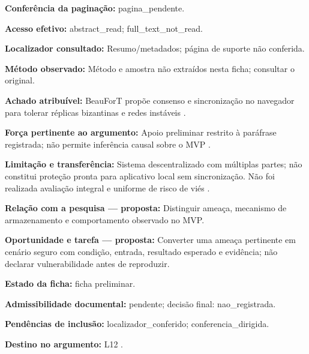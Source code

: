 \noindent\textbf{Conferência da paginação:} pagina\_pendente.\par\medskip

\noindent\textbf{Acesso efetivo:} abstract\_read; full\_text\_not\_read.\par\medskip

\noindent\textbf{Localizador consultado:} Resumo/metadados; página de suporte não conferida.\par\medskip

\noindent\textbf{Método observado:} Método e amostra não extraídos nesta ficha; consultar o original.\par\medskip

\noindent\textbf{Achado atribuível:} BeauForT propõe consenso e sincronização no navegador para tolerar réplicas bizantinas e redes instáveis \citep{OS10}.\par\medskip

\noindent\textbf{Força pertinente ao argumento:} Apoio preliminar restrito à paráfrase registrada; não permite inferência causal sobre o MVP \citep{OS10}.\par\medskip

\noindent\textbf{Limitação e transferência:} Sistema descentralizado com múltiplas partes; não constitui proteção pronta para aplicativo local sem sincronização. Não foi realizada avaliação integral e uniforme de risco de viés \citep{OS10}.\par\medskip

\noindent\textbf{Relação com a pesquisa — proposta:} Distinguir ameaça, mecanismo de armazenamento e comportamento observado no MVP.\par\medskip

\noindent\textbf{Oportunidade e tarefa — proposta:} Converter uma ameaça pertinente em cenário seguro com condição, entrada, resultado esperado e evidência; não declarar vulnerabilidade antes de reproduzir.\par\medskip

\noindent\textbf{Estado da ficha:} ficha preliminar.\par\medskip

\noindent\textbf{Admissibilidade documental:} pendente; decisão final: nao\_registrada.\par\medskip

\noindent\textbf{Pendências de inclusão:} localizador\_conferido; conferencia\_dirigida.\par\medskip

\noindent\textbf{Destino no argumento:} L12 .

